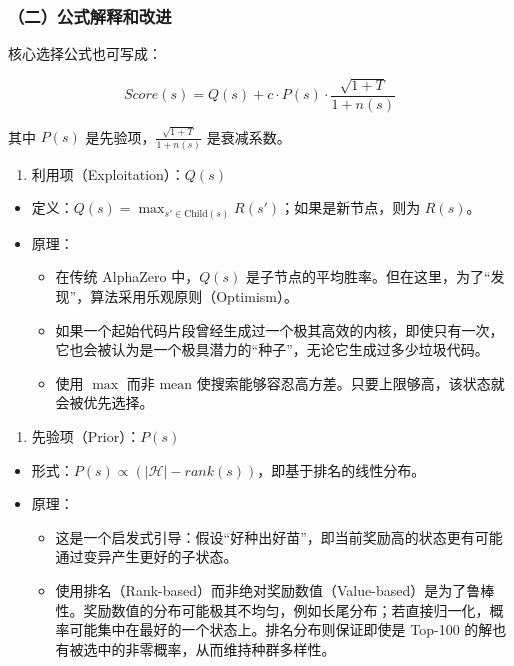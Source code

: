 \hypertarget{ux4e8cux516cux5f0fux89e3ux91caux548cux6539ux8fdb}{%
\subsubsection{（二）公式解释和改进}\label{ux4e8cux516cux5f0fux89e3ux91caux548cux6539ux8fdb}}

核心选择公式也可写成：

\[
Score(s) = Q(s) + c \cdot P(s) \cdot \frac{\sqrt{1+T}}{1+n(s)}
\]

其中 \(P(s)\) 是先验项，\(\frac{\sqrt{1+T}}{1+n(s)}\) 是衰减系数。

\begin{enumerate}
\def\labelenumi{\arabic{enumi}.}
\tightlist
\item
  利用项（Exploitation）：\(Q(s)\)
\end{enumerate}

\begin{itemize}
\tightlist
\item
  定义：\(Q(s) = \max_{s' \in \mathrm{Child}(s)} R(s')\)；如果是新节点，则为 \(R(s)\)。
\item
  原理：

  \begin{itemize}
  \tightlist
  \item
    在传统 AlphaZero 中，\(Q(s)\) 是子节点的平均胜率。但在这里，为了``发现''，算法采用乐观原则（Optimism）。
  \item
    如果一个起始代码片段曾经生成过一个极其高效的内核，即使只有一次，它也会被认为是一个极具潜力的``种子''，无论它生成过多少垃圾代码。
  \item
    使用 \(\max\) 而非 \(\mathrm{mean}\) 使搜索能够容忍高方差。只要上限够高，该状态就会被优先选择。
  \end{itemize}
\end{itemize}

\begin{enumerate}
\def\labelenumi{\arabic{enumi}.}
\setcounter{enumi}{1}
\tightlist
\item
  先验项（Prior）：\(P(s)\)
\end{enumerate}

\begin{itemize}
\tightlist
\item
  形式：\(P(s) \propto (|\mathcal{H}| - rank(s))\)，即基于排名的线性分布。
\item
  原理：

  \begin{itemize}
  \tightlist
  \item
    这是一个启发式引导：假设``好种出好苗''，即当前奖励高的状态更有可能通过变异产生更好的子状态。
  \item
    使用排名（Rank-based）而非绝对奖励数值（Value-based）是为了鲁棒性。奖励数值的分布可能极其不均匀，例如长尾分布；若直接归一化，概率可能集中在最好的一个状态上。排名分布则保证即使是 Top-100 的解也有被选中的非零概率，从而维持种群多样性。
  \end{itemize}
\end{itemize}

